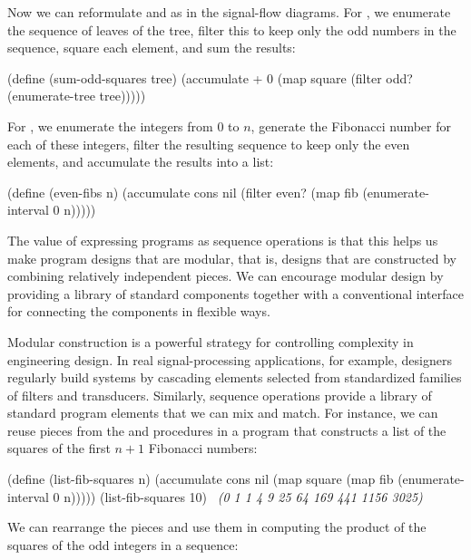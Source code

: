 \noindent
Now we can reformulate  and  as in the
signal-flow diagrams.  For , we enumerate the sequence of
leaves of the tree, filter this to keep only the odd numbers in the sequence,
square each element, and sum the results:

\begin{codeBlock}
(define (sum-odd-squares tree)
  (accumulate + 0 (map square
                       (filter
                        odd?
                        (enumerate-tree tree)))))
\end{codeBlock}

\noindent
For , we enumerate the integers from 0 to \( n \), generate the
Fibonacci number for each of these integers, filter the resulting sequence to
keep only the even elements, and accumulate the results into a list:

\begin{codeBlock}
(define (even-fibs n)
  (accumulate
   cons
   nil
   (filter even? (map fib (enumerate-interval 0 n)))))
\end{codeBlock}

\noindent
The value of expressing programs as sequence operations is that this helps us
make program designs that are modular, that is, designs that are constructed by
combining relatively independent pieces.  We can encourage modular design by
providing a library of standard components together with a conventional
interface for connecting the components in flexible ways.

Modular construction is a powerful strategy for controlling complexity in
engineering design.  In real signal-processing applications, for example,
designers regularly build systems by cascading elements selected from
standardized families of filters and transducers.  Similarly, sequence
operations provide a library of standard program elements that we can mix and
match.  For instance, we can reuse pieces from the  and
 procedures in a program that constructs a list of the squares
of the first \( n + 1 \) Fibonacci numbers:

\begin{codeBlock}
(define (list-fib-squares n)
  (accumulate
   cons
   nil
   (map square
        (map fib (enumerate-interval 0 n)))))
(list-fib-squares 10)
~\textit{(0 1 1 4 9 25 64 169 441 1156 3025)}~
\end{codeBlock}

\noindent
We can rearrange the pieces and use them in computing the product of the squares of the odd
integers in a sequence:

